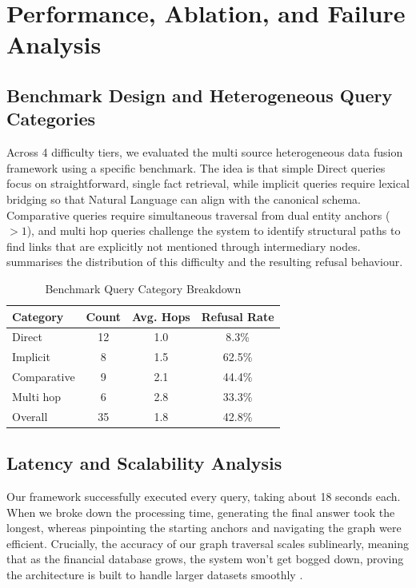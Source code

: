 \documentclass[conference]{IEEEtran}
\begin{document}
\section{Performance, Ablation, and Failure Analysis}
\subsection{Benchmark Design and Heterogeneous Query Categories}
Across 4 difficulty tiers, we evaluated the multi source heterogeneous data fusion framework using a specific benchmark. The idea is that simple Direct queries focus on straightforward, single fact retrieval, while implicit queries require lexical bridging so that Natural Language can align with the canonical schema. Comparative queries require simultaneous traversal from dual entity anchors ($>1$), and multi hop queries challenge the system to identify structural paths to find links that are explicitly not mentioned through intermediary nodes.  summarises the distribution of this difficulty and the resulting refusal behaviour.

\begin{table}[htbp]
  \caption{Benchmark Query Category Breakdown}
  \label{tab:query_cats}
  \centering
  \begin{tabular}{lccc}
    \toprule
    Category & Count & Avg. Hops & Refusal Rate \\
    \midrule
    Direct & 12 & 1.0 & 8.3\% \\
    Implicit & 8 & 1.5 & 62.5\% \\
    Comparative & 9 & 2.1 & 44.4\% \\
    Multi hop & 6 & 2.8 & 33.3\% \\
    \midrule
    Overall & 35 & 1.8 & 42.8\% \\
    \bottomrule
  \end{tabular}
\end{table}

\subsection{Latency and Scalability Analysis}
Our framework successfully executed every query, taking about 18 seconds each. When we broke down the processing time, generating the final answer took the longest, whereas pinpointing the starting anchors and navigating the graph were efficient. Crucially, the accuracy of our graph traversal scales sublinearly, meaning that as the financial database grows, the system won't get bogged down, proving the architecture is built to handle larger datasets smoothly \cite{angles2018propertygraphs}.
\end{document}
